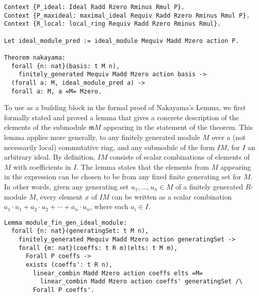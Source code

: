 \documentclass{article}
\begin{document}
\begin{verbatim}
Context {P_ideal: Ideal Radd Rzero Rminus Rmul P}.
Context {P_maxideal: maximal_ideal Requiv Radd Rzero Rminus Rmul P}.
Context {R_local: local_ring Requiv Radd Rzero Rminus Rmul}.
  
Let ideal_module_pred := ideal_module Mequiv Madd Mzero action P.

Theorem nakayama:
  forall {n: nat}(basis: t M n),
    finitely_generated Mequiv Madd Mzero action basis ->
  (forall a: M, ideal_module_pred a) ->
  forall a: M, a =M= Mzero.
\end{verbatim}

To use as a building block in the formal proof of Nakayama's Lemma, we first
formally stated and proved a lemma that gives a concrete description of the
elements of the submodule $\mathfrak{m} M$  appearing in the statement of the
theorem. This lemma applies more generally, to any finitely generated module
$M$ over a (not necessarily local) commutative ring, and any submodule of the
form $I M$, for $I$ an arbitrary ideal. By definition, $IM$ consists of scalar
combinations of elements of $M$ with coefficients in $I$. The lemma states that
the elements from $M$ appearing in the expression can be chosen to be from any
fixed finite generating set for $M$. In other words, given any generating set
$u_{1},\dots, u_{n} \in M$  of a  finitely generated $R$-module $M$, every
element $x$ of $I M$ can be written as a scalar combination $a_1 \cdot u_1 +
a_2  \cdot u_2 + \cdots + a_n  \cdot u_n$, where each $a_i \in I$. 

\begin{verbatim}
Lemma module_fin_gen_ideal_module:
  forall {n: nat}(generatingSet: t M n),
    finitely_generated Mequiv Madd Mzero action generatingSet ->
    forall {m: nat}(coeffs: t R m)(elts: t M m),
      Forall P coeffs ->
      exists (coeffs': t R n),
        linear_combin Madd Mzero action coeffs elts =M=
          linear_combin Madd Mzero action coeffs' generatingSet /\
        Forall P coeffs'.
\end{verbatim}        
\end{document}
